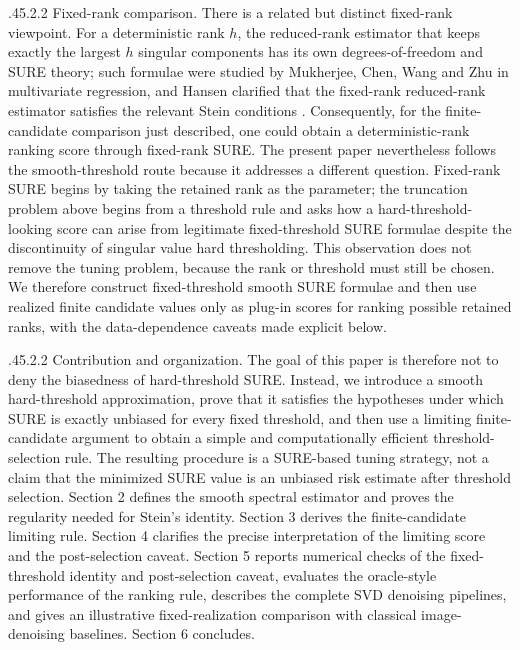\documentclass[12pt,reqno]{amsart}
\makeatletter
\numberwithin{equation}{section}
\def\paragraph{\@startsection{paragraph}{4}{\z@}%
  {.45\linespacing\@plus.2\linespacing}{.2\linespacing}%
  {\normalfont\bfseries}}
\theoremstyle{plain}
\theoremstyle{definition}
\makeatother
\begin{document}
\paragraph{Fixed-rank comparison.}
There is a related but distinct fixed-rank viewpoint. For a deterministic rank $h$, the reduced-rank estimator that keeps exactly the largest $h$ singular components has its own degrees-of-freedom and SURE theory; such formulae were studied by Mukherjee, Chen, Wang and Zhu in multivariate regression, and Hansen clarified that the fixed-rank reduced-rank estimator satisfies the relevant Stein conditions \cite{mukherjee2015degrees,hansen2017comment}. Consequently, for the finite-candidate comparison just described, one could obtain a deterministic-rank ranking score through fixed-rank SURE. The present paper nevertheless follows the smooth-threshold route because it addresses a different question. Fixed-rank SURE begins by taking the retained rank as the parameter; the truncation problem above begins from a threshold rule and asks how a hard-threshold-looking score can arise from legitimate fixed-threshold SURE formulae despite the discontinuity of singular value hard thresholding. This observation does not remove the tuning problem, because the rank or threshold must still be chosen. We therefore construct fixed-threshold smooth SURE formulae and then use realized finite candidate values only as plug-in scores for ranking possible retained ranks, with the data-dependence caveats made explicit below.

\paragraph{Contribution and organization.}
The goal of this paper is therefore not to deny the biasedness of hard-threshold SURE. Instead, we introduce a smooth hard-threshold approximation, prove that it satisfies the hypotheses under which SURE is exactly unbiased for every fixed threshold, and then use a limiting finite-candidate argument to obtain a simple and computationally efficient threshold-selection rule. The resulting procedure is a SURE-based tuning strategy, not a claim that the minimized SURE value is an unbiased risk estimate after threshold selection. Section 2 defines the smooth spectral estimator and proves the regularity needed for Stein's identity. Section 3 derives the finite-candidate limiting rule. Section 4 clarifies the precise interpretation of the limiting score and the post-selection caveat. Section 5 reports numerical checks of the fixed-threshold identity and post-selection caveat, evaluates the oracle-style performance of the ranking rule, describes the complete SVD denoising pipelines, and gives an illustrative fixed-realization comparison with classical image-denoising baselines. Section 6 concludes.
\end{document}
